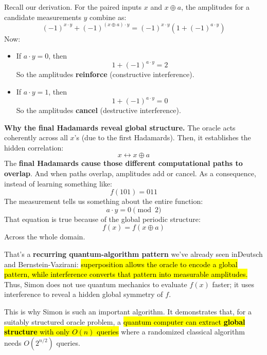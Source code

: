 \highspace
Recall our derivation. For the paired inputs $x$ and $x \oplus a$, the amplitudes for a candidate measurements $y$ combine as:
\begin{equation*}
    (-1)^{x \cdot y} + (-1)^{(x \oplus a) \cdot y} = (-1)^{x \cdot y} \left(1 + (-1)^{a \cdot y}\right)
\end{equation*}
Now:
\begin{itemize}
    \item If $a \cdot y = 0$, then
        \begin{equation*}
            1 + (-1)^{a \cdot y} = 2
        \end{equation*}
        So the amplitudes \textbf{reinforce} (constructive interference).

    \item If $a \cdot y = 1$, then
        \begin{equation*}
            1 + (-1)^{a \cdot y} = 0
        \end{equation*}
        So the amplitudes \textbf{cancel} (destructive interference).
\end{itemize}
\textcolor{Green3}{ \textbf{Why the final Hadamards reveal global structure.}} The oracle acts coherently across all $x$'s (due to the first Hadamards). Then, it establishes the hidden correlation:
\begin{equation*}
    x \leftrightarrow x \oplus a
\end{equation*}
The \textbf{final Hadamards cause those different computational paths to overlap}. And when paths overlap, amplitudes add or cancel. As a consequence, instead of learning something like:
\begin{equation*}
    f(101) = 011
\end{equation*}
The measurement tells us something about the entire function:
\begin{equation*}
    a \cdot y = 0 \pmod 2
\end{equation*}
That equation is true because of the global periodic structure:
\begin{equation*}
    f(x) = f(x \oplus a)
\end{equation*}
Across the whole domain.

\highspace
That's a \textbf{recurring quantum-algorithm pattern} we've already seen in\break Deutsch and Bernstein-Vazirani: \hl{superposition allows the oracle to encode a global pattern, while interference converts that pattern into measurable amplitudes.} Thus, Simon does not use quantum mechanics to evaluate $f(x)$ faster; it uses interference to reveal a hidden global symmetry of $f$.

\highspace
This is why Simon is such an important algorithm. It demonstrates that, for a suitably structured oracle problem, a \hl{quantum computer can extract \textbf{global structure} with only $O(n)$ queries} where a randomized classical algorithm needs $O(2^{n/2})$ queries.